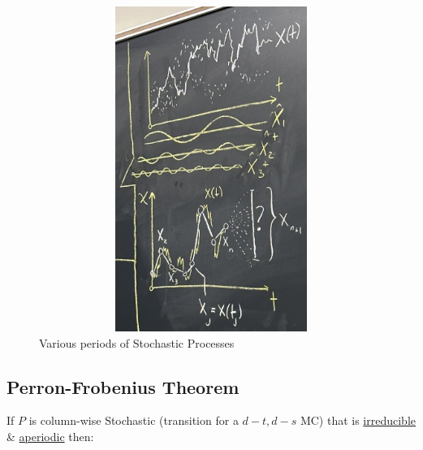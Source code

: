 \begin{figure}[H]
    \centering
    \includegraphics[height=25pc,width=40pc]{lectures/wk10/img/lec19_sp.jpeg}
    \caption{Various periods of Stochastic Processes}
    \label{fig:stoch-procs}
\end{figure}

\subsection{Perron-Frobenius Theorem}
If $P$ is column-wise Stochastic (transition for a $d-t, d-s$ MC) that is \underline{irreducible} \& \underline{aperiodic} then:

